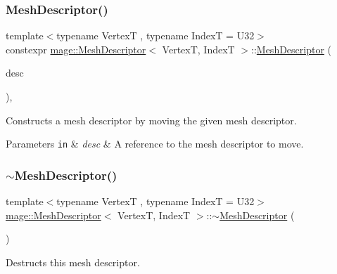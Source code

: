 \subsubsection{\texorpdfstring{Mesh\+Descriptor()}{MeshDescriptor()}\hspace{0.1cm}{\footnotesize\ttfamily [3/3]}}
{\footnotesize\ttfamily template$<$typename VertexT , typename IndexT  = U32$>$ \\
constexpr \hyperlink{classmage_1_1_mesh_descriptor}{mage\+::\+Mesh\+Descriptor}$<$ VertexT, IndexT $>$\+::\hyperlink{classmage_1_1_mesh_descriptor}{Mesh\+Descriptor} (\begin{DoxyParamCaption}\item[{\hyperlink{classmage_1_1_mesh_descriptor}{Mesh\+Descriptor}$<$ VertexT, IndexT $>$ \&\&}]{desc }\end{DoxyParamCaption})\hspace{0.3cm}{\ttfamily [default]}, {\ttfamily [noexcept]}}

Constructs a mesh descriptor by moving the given mesh descriptor.


\begin{DoxyParams}[1]{Parameters}
\mbox{\tt in}  & {\em desc} & A reference to the mesh descriptor to move. \\
\hline
\end{DoxyParams}
\hypertarget{classmage_1_1_mesh_descriptor_a7a2998a335d355ea366df8df1b1df0e5}{}\label{classmage_1_1_mesh_descriptor_a7a2998a335d355ea366df8df1b1df0e5} 
\subsubsection{\texorpdfstring{$\sim$\+Mesh\+Descriptor()}{~MeshDescriptor()}}
{\footnotesize\ttfamily template$<$typename VertexT , typename IndexT  = U32$>$ \\
\hyperlink{classmage_1_1_mesh_descriptor}{mage\+::\+Mesh\+Descriptor}$<$ VertexT, IndexT $>$\+::$\sim$\hyperlink{classmage_1_1_mesh_descriptor}{Mesh\+Descriptor} (\begin{DoxyParamCaption}{ }\end{DoxyParamCaption})\hspace{0.3cm}{\ttfamily [default]}}

Destructs this mesh descriptor. 

